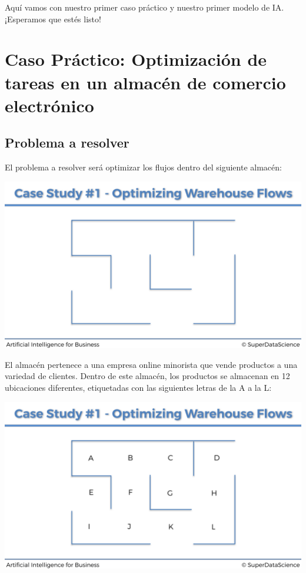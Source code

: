 \documentclass[
]{book}
\begin{document}
Aquí vamos con nuestro primer caso práctico y nuestro primer modelo de IA. ¡Esperamos que estés listo!

\hypertarget{caso-pruxe1ctico-optimizaciuxf3n-de-tareas-en-un-almacuxe9n-de-comercio-electruxf3nico}{%
\section{Caso Práctico: Optimización de tareas en un almacén de comercio electrónico}\label{caso-pruxe1ctico-optimizaciuxf3n-de-tareas-en-un-almacuxe9n-de-comercio-electruxf3nico}}

\hypertarget{problema-a-resolver}{%
\subsection{Problema a resolver}\label{problema-a-resolver}}

El problema a resolver será optimizar los flujos dentro del siguiente almacén:

\includegraphics[width=1\textwidth,height=\textheight]{Images/Warehouse_1.png}

El almacén pertenece a una empresa online minorista que vende productos a una variedad de clientes. Dentro de este almacén, los productos se almacenan en 12 ubicaciones diferentes, etiquetadas con las siguientes letras de la A a la L:

\includegraphics[width=1\textwidth,height=\textheight]{Images/Warehouse_2.png}
\end{document}
